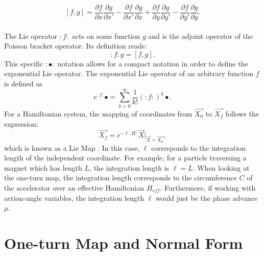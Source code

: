 \begin{equation}
    \label{eq:ch2poisson1}
    \left[ f,g \right] = \frac{\partial f}{\partial x}\frac{\partial g}{\partial x'} - \frac{\partial f}{\partial x'}\frac{\partial g}{\partial x} + \frac{\partial f}{\partial y}\frac{\partial g}{\partial y'} - \frac{\partial f}{\partial y'}\frac{\partial g}{\partial y}. 
\end{equation}\\
The Lie operator $:f:$ acts on some function $g$ and is the adjoint operator of the Poisson bracket operator. Its definition reads:
\begin{equation}
    \label{eq:ch2lie1}
    :f:g = \left[ f,g \right].
\end{equation}
This specific $:\bullet:$ notation allows for a compact notation in order to define the exponential Lie operator. The exponential Lie operator of an arbitrary function $f$ is defined as
\begin{equation}
    \label{eq:ch2explie1}
    e^{:f:}\bullet = \sum_{k=0}^{\infty}\frac{1}{k!}\left( :f: \right)^k \bullet.
\end{equation}
For a Hamiltonian system, the mapping of coordinates from $\vec{X_0}$ to $\vec{X_f}$ follows the expression:
\begin{equation}
    \label{eq:ch2liemap1}
    \vec{X_f}=e^{-\ell :H:}\vec{X}\bigg\rvert_{\vec{X}=\vec{X_0}},
\end{equation}
which is known as a Lie Map \cite{todd1}. In this case, $\ell$ corresponds to the integration length of the independent coordinate. For example, for a particle traversing a magnet which has length $L$, the integration length is $\ell = L$. When looking at the one-turn map, the integration length corresponds to the circumference $C$ of the accelerator over an effective Hamiltonian $H_{eff}$. Furthermore, if working with action-angle variables, the integration length $\ell$ would just be the phase advance $\mu$.\\ 

\section{\label{sec:oneturn}One-turn Map and Normal Form}

